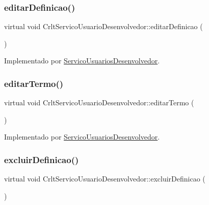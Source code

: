 \subsubsection{\texorpdfstring{editar\+Definicao()}{editarDefinicao()}}
{\footnotesize\ttfamily virtual void Crlt\+Servico\+Usuario\+Desenvolvedor\+::editar\+Definicao (\begin{DoxyParamCaption}{ }\end{DoxyParamCaption})\hspace{0.3cm}{\ttfamily [pure virtual]}}



Implementado por \mbox{\hyperlink{class_servico_usuarios_desenvolvedor_a2a1063014d21344c6ec9a101741e5a4e}{Servico\+Usuarios\+Desenvolvedor}}.

\mbox{\label{class_crlt_servico_usuario_desenvolvedor_a60098c3dd81dfb83ea03f4b7ace785dc}} 
\subsubsection{\texorpdfstring{editar\+Termo()}{editarTermo()}}
{\footnotesize\ttfamily virtual void Crlt\+Servico\+Usuario\+Desenvolvedor\+::editar\+Termo (\begin{DoxyParamCaption}{ }\end{DoxyParamCaption})\hspace{0.3cm}{\ttfamily [pure virtual]}}



Implementado por \mbox{\hyperlink{class_servico_usuarios_desenvolvedor_afb392520e6ea1209abb42ad0327673e0}{Servico\+Usuarios\+Desenvolvedor}}.

\mbox{\label{class_crlt_servico_usuario_desenvolvedor_a518fe0443e450a73a7274b8dbef74a71}} 
\subsubsection{\texorpdfstring{excluir\+Definicao()}{excluirDefinicao()}}
{\footnotesize\ttfamily virtual void Crlt\+Servico\+Usuario\+Desenvolvedor\+::excluir\+Definicao (\begin{DoxyParamCaption}{ }\end{DoxyParamCaption})\hspace{0.3cm}{\ttfamily [pure virtual]}}



